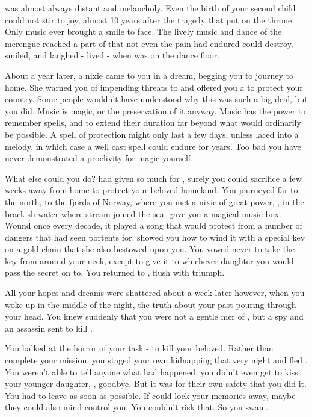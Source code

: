 \documentclass[char]{NeptuneBall}
\begin{document}
\cKing{\King} \cKing{} was almost always distant and melancholy. Even the birth of your second child could not stir \cKing{\them} to joy, almost 10 years after the tragedy that put \cKing{\them} on the throne. Only music ever brought a smile to \cKing{\their} face. The lively music and dance of the merengue reached a part of \cKing{\them} that not even the pain \cKing{\they} had endured could destroy. \cKing{\They} smiled, and laughed - \cKing{\They} lived - when \cKing{\they} was on the dance floor.

About a year later, a nixie came to you in a dream, begging you to journey to \cNixie{\them} home. She warned you of impending threats to \pAtlantis{} and offered you a \iMusicBox{\MYname} to protect your country. Some people wouldn't have understood why this was such a big deal, but you did. Music is magic, or the preservation of it anyway. Music has the power to remember spells, and to extend their duration far beyond what would ordinarily be possible. A spell of protection might only last a few days, unless laced into a melody, in which case a well cast spell could endure for years. Too bad you have never demonstrated a proclivity for magic yourself.

What else could you do? \cKing{} had given so much for \pAtlantis{}, surely you could sacrifice a few weeks away from home to protect your beloved homeland. You journeyed far to the north, to the fjords of Norway, where you met a nixie of great power, \cNixie{\MYname}, in the brackish water where \cNixie{\them} stream joined the sea. \cNixie{} gave you a magical music box. Wound once every decade, it played a song that would protect \pAtlantis{} from a number of dangers that \cNixie{} had seen portents for. \cNixie{\They} showed you how to wind it with a special key on a gold chain that she also bestowed upon you. You vowed never to take the key from around your neck, except to give it to whichever daughter you would pass the secret on to. You returned to \pAtlantis{}, flush with triumph.

All your hopes and dreams were shattered about a week later however, when you woke up in the middle of the night, the truth about your past pouring through your head. You knew suddenly that you were not a gentle mer\cQueen{\human} of \pAtlantis{}, but a spy and an assassin sent to kill \cKing{\King} \cKing{}.

You balked at the horror of your task - to kill your beloved. Rather than complete your mission, you staged your own kidnapping that very night and fled \pAtlantis{}. You weren't able to tell anyone what had happened, you didn't even get to kiss your younger daughter, \cPrincess{}, goodbye. But it was for their own safety that you did it. You had to leave as soon as possible. If \pAssassin{} could lock your memories away, maybe they could also mind control you. You couldn't risk that. So you swam.
\end{document}

